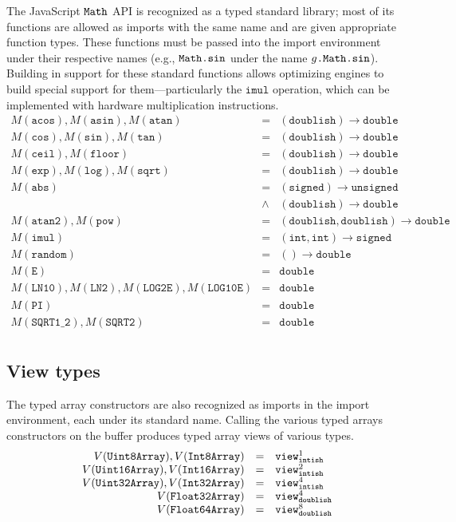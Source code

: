 \documentclass{article}
\newcommand{\funty}[2]{({#1}) \rightarrow {#2}}
\newcommand{\mathjs}[1]{\mbox{\texttt{{#1}}}}
\newcommand{\mathjssm}[1]{\mbox{\texttt{\scriptsize {#1}}}}
\newcommand{\unsigned}{\mathtt{unsigned}}
\newcommand{\intsm}{\mathjssm{intish}}
\newcommand{\doublesm}{\mathjssm{doublish}}
\newcommand{\signed}{\mathtt{signed}}
\newcommand{\double}{\mathtt{double}}
\newcommand{\view}[2]{\mathtt{view}^{#1}_{#2}}
\renewcommand{\int}{\mathtt{int}}
\newcommand{\imul}{\mathtt{imul}}
\newcommand{\doublish}{\mathtt{doublish}}
\begin{document}
The JavaScript $\mathjs{Math}$ API is recognized as a typed standard
library; most of its functions are allowed as imports with the same
name and are given appropriate function types. These functions must be
passed into the import environment under their respective names (e.g.,
$\mathjs{Math.sin}$ under the name $g\mathjs{.Math.sin}$). Building in
support for these standard functions allows optimizing engines to
build special support for them---particularly the $\imul$ operation,
which can be implemented with hardware multiplication instructions.
\[
\begin{array}{rcl}
M(\mathtt{acos}), M(\mathtt{asin}), M(\mathtt{atan}) & = & \funty{\doublish}{\double} \\
M(\mathtt{cos}), M(\mathtt{sin}), M(\mathtt{tan})    & = & \funty{\doublish}{\double} \\
M(\mathtt{ceil}), M(\mathtt{floor})                  & = & \funty{\doublish}{\double} \\
M(\mathtt{exp}), M(\mathtt{log}), M(\mathtt{sqrt})   & = & \funty{\doublish}{\double} \\
M(\mathtt{abs}) & =     & \funty{\signed}{\unsigned} \\
                & \land & \funty{\doublish}{\double} \\
M(\mathtt{atan2}), M(\mathtt{pow}) & = & \funty{\doublish, \doublish}{\double} \\
M(\imul) & = & \funty{\int, \int}{\signed} \\
M(\mathtt{random}) & = & \funty{}{\double} \\
M(\mathtt{E}) & = & \double \\
M(\mathtt{LN10}), M(\mathtt{LN2}), M(\mathtt{LOG2E}), M(\mathtt{LOG10E}) & = & \double \\
M(\mathtt{PI}) & = & \double \\
M(\mathtt{SQRT1\_2}), M(\mathtt{SQRT2}) & = & \double \\
\end{array}
\]

\subsection{View types}

The typed array constructors are also recognized as imports in the
import environment, each under its standard name. Calling the various
typed arrays constructors on the buffer produces typed array views of
various types.
\[
\begin{array}{rcl}
V(\mathtt{Uint8Array}), V(\mathtt{Int8Array})   & = & \view{1}{\intsm} \\
V(\mathtt{Uint16Array}), V(\mathtt{Int16Array}) & = & \view{2}{\intsm} \\
V(\mathtt{Uint32Array}), V(\mathtt{Int32Array}) & = & \view{4}{\intsm} \\
V(\mathtt{Float32Array})                        & = & \view{4}{\doublesm} \\
V(\mathtt{Float64Array})                        & = & \view{8}{\doublesm} \\
\end{array}
\]
\end{document}

